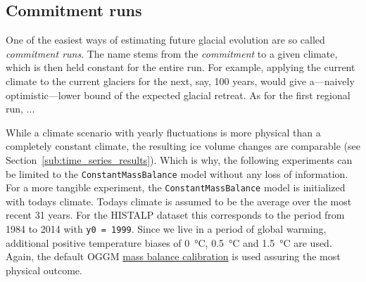 
    \subsection{Commitment runs} %
    \label{sub:commitment_runs_setup}
        One of the easiest ways of estimating future glacial evolution are so called \textit{commitment runs}.
        The name stems from the \textit{commitment} to a given climate, which is then held constant for the entire run. For example, applying the current climate to the current glaciers for the next, say, 100 years, would give a---naively optimistic---lower bound of the expected glacial retreat. As for the first regional run, ... %

        While a climate scenario with yearly fluctuations is more physical than a completely constant climate, the resulting ice volume changes are comparable (see Section~\ref{sub:time_series_results}). Which is why, the following experiments can be limited to the \lstinline`ConstantMassBalance` model without any loss of information. For a more tangible experiment, the \lstinline`ConstantMassBalance` model is initialized with todays climate. Todays climate is assumed to be the average over the most recent 31 years. For the HISTALP dataset this corresponds to the period from 1984 to 2014 with \lstinline`y0 = 1999`. Since we live in a period of global warming, additional positive temperature biases of \SI{0}{\celsius}, \SI{+0.5}{\celsius} and \SI{+1.5}{\celsius} are used. Again, the default OGGM \hyperref[ssub:mb_calib]{mass balance calibration} is used assuring the most physical outcome.
    

